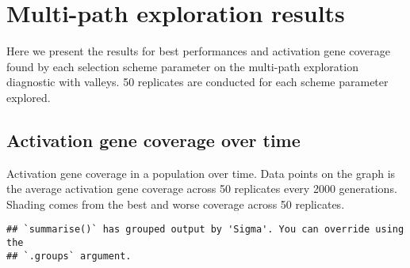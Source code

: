 \documentclass[]{book}
\newenvironment{Shaded}{\begin{snugshade}}{\end{snugshade}}
\newcommand{\DataTypeTok}[1]{\textcolor[rgb]{0.13,0.29,0.53}{#1}}
\newcommand{\KeywordTok}[1]{\textcolor[rgb]{0.13,0.29,0.53}{\textbf{#1}}}
\newcommand{\NormalTok}[1]{#1}
\newcommand{\OperatorTok}[1]{\textcolor[rgb]{0.81,0.36,0.00}{\textbf{#1}}}
\newcommand{\StringTok}[1]{\textcolor[rgb]{0.31,0.60,0.02}{#1}}
\begin{document}
\hypertarget{multi-path-exploration-results-3}{%
\section{Multi-path exploration results}\label{multi-path-exploration-results-3}}

Here we present the results for best performances and activation gene coverage found by each selection scheme parameter on the multi-path exploration diagnostic with valleys.
50 replicates are conducted for each scheme parameter explored.

\hypertarget{activation-gene-coverage-over-time-7}{%
\subsection{Activation gene coverage over time}\label{activation-gene-coverage-over-time-7}}

Activation gene coverage in a population over time.
Data points on the graph is the average activation gene coverage across 50 replicates every 2000 generations.
Shading comes from the best and worse coverage across 50 replicates.

\begin{Shaded}
\end{Shaded}

\begin{verbatim}
## `summarise()` has grouped output by 'Sigma'. You can override using the
## `.groups` argument.
\end{verbatim}
\end{document}
